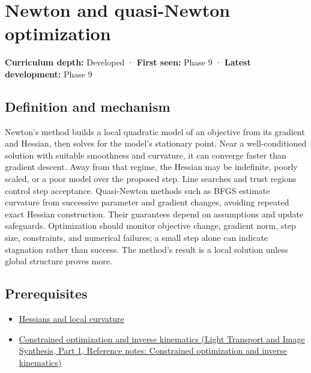 \hypertarget{appendix-54c8f5828387}{}\label{referencestart:appendix-54c8f5828387}
\section{Newton and quasi-Newton optimization}\label{appendix-54c8f5828387-newton-and-quasi-newton-optimization}

\hypertarget{appendix-54c8f5828387-newton-and-quasi-newton-optimization}{}

\textbf{Curriculum depth:} Developed · \textbf{First seen:} Phase 9 · \textbf{Latest development:} Phase 9

\begin{allmightroledefinition}

\subsection{Definition and mechanism}\label{appendix-54c8f5828387-definition-and-mechanism}

\hypertarget{appendix-54c8f5828387-definition-and-mechanism}{}

Newton's method builds a local quadratic model of an objective from its gradient and Hessian, then solves for the model's stationary point. Near a well-conditioned solution with suitable smoothness and curvature, it can converge faster than gradient descent. Away from that regime, the Hessian may be indefinite, poorly scaled, or a poor model over the proposed step. Line searches and trust regions control step acceptance. Quasi-Newton methods such as BFGS estimate curvature from successive parameter and gradient changes, avoiding repeated exact Hessian construction. Their guarantees depend on assumptions and update safeguards. Optimization should monitor objective change, gradient norm, step size, constraints, and numerical failures; a small step alone can indicate stagnation rather than success. The method's result is a local solution unless global structure proves more.

\end{allmightroledefinition}

\subsection{Prerequisites}\label{appendix-54c8f5828387-prerequisites}

\hypertarget{appendix-54c8f5828387-prerequisites}{}

\begin{itemize}
\tightlist
\item
  \hyperref[appendix-6ac071f8b50c]{Hessians and local curvature}
\item
  \href{../04-Light-Transport-and-Image-Synthesis-P01/main.pdf\#appendix-29f4bea4c2bb}{Constrained optimization and inverse kinematics (Light Transport and Image Synthesis, Part 1, Reference notes: Constrained optimization and inverse kinematics)}
\end{itemize}

